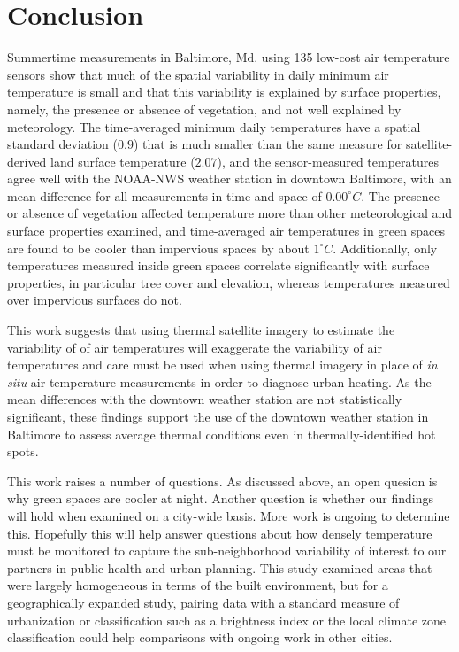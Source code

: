 \section{Conclusion}

Summertime measurements in Baltimore, Md. using 135 low-cost air temperature sensors show that much of the spatial variability in daily minimum air temperature is small and that this variability is explained by surface properties, namely, the presence or absence of vegetation, and not well explained by meteorology. The time-averaged minimum daily temperatures have a spatial standard deviation ($0.9$) that is much smaller than the same measure for satellite-derived land surface temperature ($2.07$), and the sensor-measured temperatures agree well with the NOAA-NWS weather station in downtown Baltimore, with an mean difference for all measurements in time and space of $0.00^{\circ}C$. The presence or absence of vegetation affected temperature more than other meteorological and surface properties examined, and time-averaged air temperatures in green spaces are found to be cooler than impervious spaces by about $1^{\circ} C$. Additionally, only temperatures measured inside green spaces correlate significantly with surface properties, in particular tree cover and elevation, whereas temperatures measured over impervious surfaces do not. 

This work suggests that using thermal satellite imagery to estimate the variability of of air temperatures will exaggerate the variability of air temperatures and care must be used when using thermal imagery in place of \textit{in situ} air temperature measurements in order to diagnose urban heating. As the mean differences with the downtown weather station are not statistically significant, these findings support the use of the downtown weather station in Baltimore to assess average thermal conditions even in thermally-identified hot spots. 

This work raises a number of questions. As discussed above, an open quesion is why green spaces are cooler at night. Another question is whether our findings will hold when examined on a city-wide basis.  More work is ongoing to determine this. Hopefully this will help answer questions about how densely temperature must be monitored to capture the sub-neighborhood variability of interest to our partners in public health and urban planning. This study examined areas that were largely homogeneous in terms of the built environment, but for a geographically expanded study, pairing data with a standard measure of urbanization or classification such as a brightness index or the local climate zone classification could help comparisons with ongoing work in other cities.
